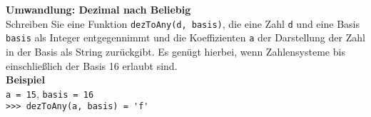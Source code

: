 \textbf{Umwandlung: Dezimal nach Beliebig}\\
Schreiben Sie eine Funktion \verb|dezToAny(d, basis)|, die
eine Zahl \verb|d| und eine Basis \verb|basis| als Integer entgegennimmt und die
Koeffizienten \verb|a| der Darstellung der Zahl in der Basis als String zurückgibt. Es genügt hierbei, wenn Zahlensysteme bis einschließlich der Basis 16 erlaubt sind.\\

\textbf{Beispiel} \\
\verb|a = 15|, \verb|basis = 16| \\
\verb|>>> dezToAny(a, basis) = 'f'|